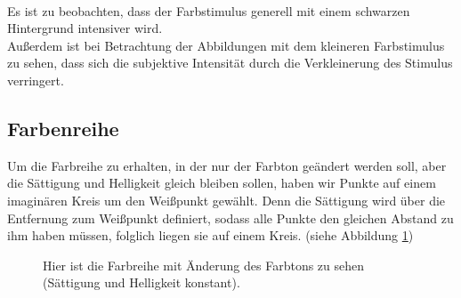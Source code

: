 \documentclass[11pt]{article}
\begin{document}
\\

Es ist zu beobachten, dass der Farbstimulus generell mit einem schwarzen Hintergrund intensiver wird. \\
Außerdem ist bei Betrachtung der Abbildungen mit dem kleineren Farbstimulus zu sehen, dass sich die subjektive Intensität durch die Verkleinerung des Stimulus verringert. 


\subsection{Farbenreihe}
Um die Farbreihe zu erhalten, in der nur der Farbton geändert werden soll, aber die Sättigung und Helligkeit gleich bleiben sollen, haben wir Punkte auf einem imaginären Kreis um den Weißpunkt gewählt. Denn die Sättigung wird über die Entfernung zum Weißpunkt definiert, sodass alle Punkte den gleichen Abstand zu ihm haben müssen, folglich liegen sie auf einem Kreis. (siehe Abbildung \ref{farbton_reihe})
\begin{figure}[H]
\caption{Hier ist die Farbreihe mit Änderung des Farbtons zu sehen (Sättigung und Helligkeit konstant).}
\label{farbton_reihe}
\end{figure}
\end{document}
